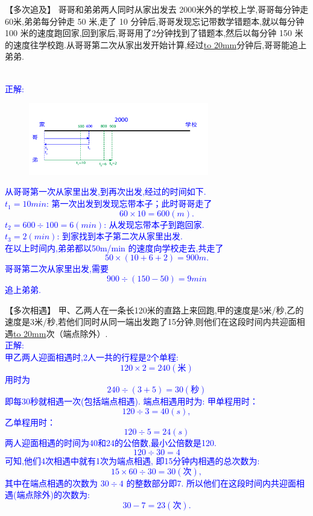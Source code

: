 \item {
    【多次追及】
    哥哥和弟弟两人同时从家出发去 2000米外的学校上学,哥哥每分钟走 60米,弟弟每分钟走 50 米,走了 10 分钟后,哥哥发现忘记带数学错题本,就以每分钟 100 米的速度跑回家,回到家后,哥哥用了2分钟找到了错题本,然后以每分钟 150 米的速度往学校跑.从哥哥第二次从家出发开始计算,经过\underline{\hbox to 20mm{}}分钟后,哥哥能追上弟弟.
    \ifshowSolution 
        \fangsong{}\textcolor{blue}{
            \\正解: \\
            \begin{figure}[H] 
                \centering
                \includegraphics[width=0.7\textwidth]{./pics/Chapter_3/seikai_2.png}
            \end{figure}
                从哥哥第一次从家里出发,到再次出发,经过的时间如下.\\
                $t_1=10 min$: 第一次出发到发现忘带本子；此时哥哥走了
                \[60\times 10 = 600 (m).\]
                $t_2=600\div 100 = 6(min)$: 从发现忘带本子到跑回家.\\
                $t_3=2(min)$: 到家找到本子第二次从家里出发.\\
                在以上时间内,弟弟都以50m/min 的速度向学校走去,共走了
                \[ 50\times (10+6+2) = 900 m.\]
                哥哥第二次从家里出发,需要
                \[900\div (150 - 50) = 9 min \]
                追上弟弟.
        }
    \else
        \vspace{2cm}
    \fi
}

\item {
    【多次相遇】
    甲、乙两人在一条长120米的直路上来回跑,甲的速度是5米/秒,乙的速度是3米/秒,若他们同时从同一端出发跑了15分钟,则他们在这段时间内共迎面相遇\underline{\hbox to 20mm{}}次（端点除外）. 
    \ifshowSolution 
        \fangsong{}\textcolor{blue}{
            \\正解: \\
                甲乙两人迎面相遇时,2人一共的行程是2个单程:
                $$120\times 2=240(米)$$
                用时为
                $$240\div (3+5)=30(秒)$$
                即每30秒就相遇一次(包括端点相遇).
                端点相遇用时为:
                甲单程用时：
                 $$120\div 3 = 40 (s),$$
                乙单程用时：
                $$120\div 5=24 (s)$$
                两人迎面相遇的时间为40和24的公倍数,最小公倍数是120.
                $$120\div 30=4$$
                可知,他们4次相遇中就有1次为端点相遇,
                即15分钟内相遇的总次数为:
                 $$15\times 60\div 30 = 30(次),$$
                其中在端点相遇的次数为 $30\div 4$ 的整数部分即7.
                所以他们在这段时间内共迎面相遇(端点除外)的次数为:
                $$30-7=23(次).$$
        }
    \else
        \vspace{2cm}
    \fi
}

